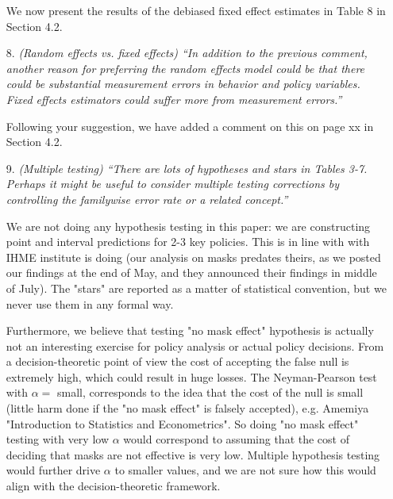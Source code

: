 \documentclass[11pt]{article}
\begin{document}
\begin{itemize}
We now present the results of the debiased fixed effect estimates in Table 8 in Section 4.2. 
  
\item[8.]  \textit{(Random effects vs. fixed effects) ``In addition to the previous comment, another reason for
preferring the random effects model could be that there could be substantial measurement
errors in behavior and policy variables. Fixed effects estimators could suffer more from measurement
errors.''}

Following your suggestion, we have added a comment on this on page xx in Section 4.2.
  
\item[9.]  \textit{(Multiple testing) ``There are lots of hypotheses and stars in Tables 3-7. Perhaps it might be
useful to consider multiple testing corrections by controlling the familywise error rate or a
related concept.''}

We are not doing any hypothesis testing in this paper: we are constructing point and interval predictions for 2-3 key policies. This
is in line with with IHME institute is doing (our analysis on masks predates theirs, as we posted our findings
at the end of May, and they announced their findings in middle of July). The 
"stars" are reported as a matter of statistical convention, but we never use them in any formal way.

Furthermore, we believe that testing "no mask effect" hypothesis is actually not an interesting exercise for policy analysis
or actual policy decisions.   From a decision-theoretic point of view the cost of accepting the false null is extremely high,
which could result in huge losses. The Neyman-Pearson test with $\alpha=$ small, corresponds to the idea that the cost
of the null is small (little harm done if the "no mask effect" is falsely accepted), e.g. Amemiya "Introduction to Statistics and Econometrics".  So doing "no mask effect" testing with very low $\alpha$ would correspond to assuming that the cost of deciding that masks are not effective is very low.  Multiple hypothesis testing would further drive $\alpha$ to smaller values, and we are not sure how this would align with the decision-theoretic framework.




\end{itemize}
\end{document}
